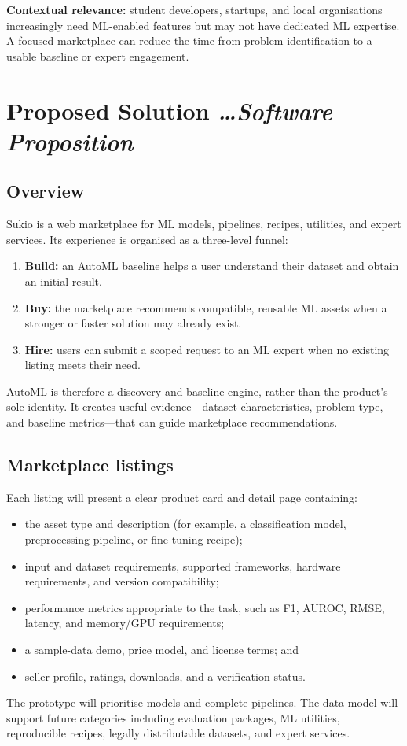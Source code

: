 \documentclass[11pt,a4paper]{article}
\newcommand{\BvrHint}[1]{{\normalfont\normalsize\itshape\hfill #1}}
\begin{document}
\textbf{Contextual relevance:} student developers, startups, and local organisations increasingly need ML-enabled features but may not have dedicated ML expertise. A focused marketplace can reduce the time from problem identification to a usable baseline or expert engagement.

\section{Proposed Solution \BvrHint{\ldots Software Proposition}}
\subsection{Overview}
Sukio is a web marketplace for ML models, pipelines, recipes, utilities, and expert services. Its experience is organised as a three-level funnel:
\begin{enumerate}[leftmargin=0.7cm]
  \item \textbf{Build:} an AutoML baseline helps a user understand their dataset and obtain an initial result.
  \item \textbf{Buy:} the marketplace recommends compatible, reusable ML assets when a stronger or faster solution may already exist.
  \item \textbf{Hire:} users can submit a scoped request to an ML expert when no existing listing meets their need.
\end{enumerate}
AutoML is therefore a discovery and baseline engine, rather than the product's sole identity. It creates useful evidence---dataset characteristics, problem type, and baseline metrics---that can guide marketplace recommendations.

\subsection{Marketplace listings}
Each listing will present a clear product card and detail page containing:
\begin{itemize}[leftmargin=0.7cm]
  \item the asset type and description (for example, a classification model, preprocessing pipeline, or fine-tuning recipe);
  \item input and dataset requirements, supported frameworks, hardware requirements, and version compatibility;
  \item performance metrics appropriate to the task, such as F1, AUROC, RMSE, latency, and memory/GPU requirements;
  \item a sample-data demo, price model, and license terms; and
  \item seller profile, ratings, downloads, and a verification status.
\end{itemize}
The prototype will prioritise models and complete pipelines. The data model will support future categories including evaluation packages, ML utilities, reproducible recipes, legally distributable datasets, and expert services.
\end{document}
